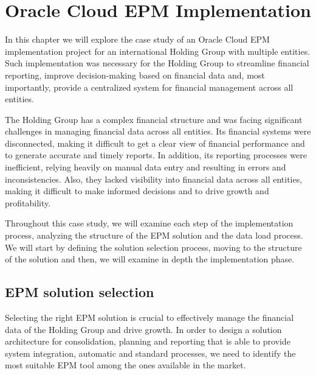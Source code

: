 \documentclass[12pt,a4paper,openright,twoside]{book}
\begin{document}
\chapter{Oracle Cloud EPM Implementation}
\label{chap:implementation}

In this chapter we will explore the case study of an Oracle Cloud EPM implementation project for an international Holding Group with multiple entities.
%
Such implementation was necessary for the Holding Group to streamline financial reporting, improve decision-making based on financial data and, most importantly, provide a centralized system for financial management across all entities.

The Holding Group has a complex financial structure and was facing significant challenges in managing financial data across all entities. 
%
Its financial systems were disconnected, making it difficult to get a clear view of financial performance and to generate accurate and timely reports. 
%
In addition, its reporting processes were inefficient, relying heavily on manual data entry and resulting in errors and inconsistencies. 
%
Also, they lacked visibility into financial data across all entities, making it difficult to make informed decisions and to drive growth and profitability.

Throughout this case study, we will examine each step of the implementation process, analyzing the structure of the EPM solution and the data load process.
%
We will start by defining the solution selection process, moving to the structure of the solution and then, we will examine in depth the implementation phase.

\section{EPM solution selection}

Selecting the right EPM solution is crucial to effectively manage the financial data of the Holding Group and drive growth.
%
In order to design a solution architecture for consolidation, planning and reporting that is able to provide system integration, automatic and standard processes, we need to identify the most suitable EPM tool among the ones available in the market.
\end{document}
